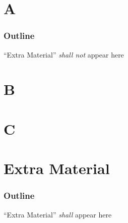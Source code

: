\documentclass{beamer}
\begin{document}
\section{A}

\begin{frame}
  \frametitle{Outline}
  \tableofcontents[currentsection,sections=1-3]

  ``Extra Material'' \emph{shall not} appear here
\end{frame}

\begin{frame}
\end{frame}

\section{B}

\begin{frame}
\end{frame}

\section{C}

\begin{frame}
\end{frame}

\section{Extra Material}

\begin{frame}
  \frametitle{Outline}
  \tableofcontents[currentsection]

  ``Extra Material'' \emph{shall} appear here
\end{frame}

\begin{frame}
\end{frame}
\end{document}
